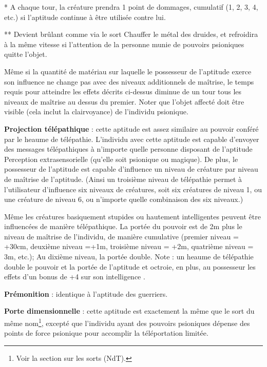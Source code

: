 \documentclass[11pt]{article}
\begin{document}
{\bigskip

* A chaque tour, la créature prendra 1 point de dommages, cumulatif (1, 2, 3, 4, etc.) si l'aptitude continue à être utilisée contre lui.

\bigskip

** Devient brûlant comme via le sort Chauffer le métal des druides, et refroidira à la même vitesse si l'attention de la personne munie de pouvoirs psioniques quitte l'objet.

\bigskip

Même si la quantité de matériau sur laquelle le possesseur de l'aptitude exerce son influence ne change pas avec des niveaux additionnels de maîtrise, le temps requis pour atteindre les effets décrits ci-dessus diminue de un tour tous les niveaux de maîtrise au dessus du premier. Noter que l'objet affecté doit être visible (cela inclut la clairvoyance) de l'individu psionique.

\bigskip

\textbf{Projection télépathique} : cette aptitude est assez similaire au pouvoir conféré par le heaume de télépathie. L'individu avec cette aptitude est capable d'envoyer des messages télépathiques à n'importe quelle personne  disposant de l'aptitude Perception extrasensorielle (qu'elle soit psionique ou magique). De plus, le possesseur de l'aptitude est capable d'influence un niveau de créature par niveau de maîtrise de l'aptitude. (Ainsi un troisième niveau de télépathie permet à l'utilisateur d'influence six niveaux de créatures, soit six créatures de niveau 1, ou une créature de niveau 6, ou n'importe quelle combinaison des six niveaux.)

\bigskip

Même les créatures basiquement stupides ou hautement intelligentes peuvent être influencées de manière télépathique. La portée du pouvoir est de 2m plus le niveau de maîtrise de l'individu, de manière cumulative (premier niveau = +30cm, deuxième niveau =+1m, troisième niveau = +2m, quatrième niveau = 3m, etc.); Au dixième niveau, la portée double. Note : un heaume de télépathie double le pouvoir et la portée de l'aptitude et octroie, en plus, au possesseur les effets d'un bonus de +4 sur son intelligence .

\bigskip

\textbf{Prémonition} : identique à l'aptitude des guerriers.

\bigskip

\textbf{Porte dimensionnelle} : cette aptitude est exactement la même que le sort du même nom\footnote{Voir la section sur les sorts (NdT).}, excepté que l'individu ayant des pouvoirs psioniques dépense des points de force psionique pour accomplir la téléportation limitée.

}
\end{document}
